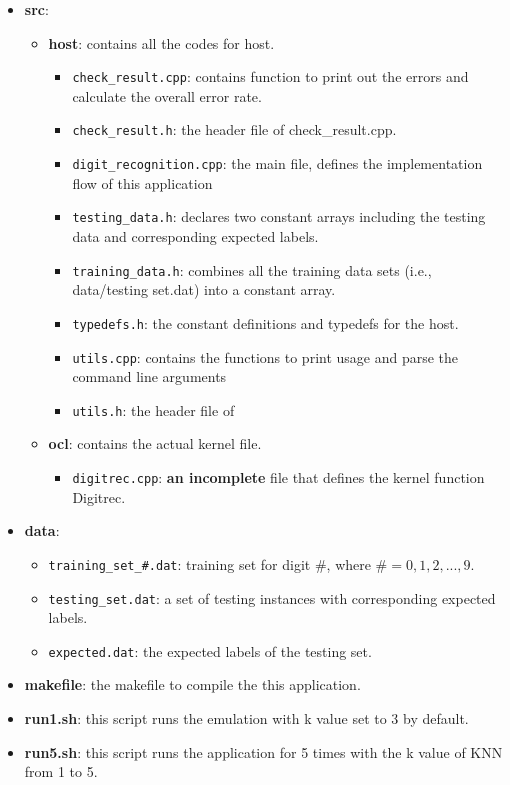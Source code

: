 \documentclass[paper=letter, fontsize=10pt]{scrartcl} %
\numberwithin{equation}{section} %
\numberwithin{figure}{section} %
\numberwithin{table}{section} %
\begin{document}
\begin{itemize}
  \item \textbf{src}: 
   	\begin{itemize}
	 	\item \textbf{host}: contains all the codes for host.
		 	\begin{itemize}
	 			\item \texttt{check\_result.cpp}: contains function to print out the errors and calculate the overall error rate.
				\item \texttt{check\_result.h}: the header file of check\_result.cpp.
	 			\item \texttt{digit\_recognition.cpp}: the main file, defines the implementation flow of this application
				\item \texttt{testing\_data.h}: declares two constant arrays including the testing data and corresponding expected labels. 
				\item \texttt{training\_data.h}: combines all the training data sets (i.e., data/testing set.dat) into a constant array. 
				\item \texttt{typedefs.h}: the constant definitions and typedefs for the host. 
				\item \texttt{utils.cpp}: contains the functions to print usage and parse the command line arguments
				\item \texttt{utils.h}: the header file of 
			\end{itemize}
		\item \textbf{ocl}: contains the actual kernel file.
		 	\begin{itemize}
	 			\item \texttt{digitrec.cpp}: \textbf{an incomplete} file that defines the kernel function Digitrec.
			\end{itemize}
	\end{itemize}
  \item \textbf{data}:
  	\begin{itemize}
	 	\item \texttt{training\_set\_\#.dat}: training set for digit $\#$, where $\#=0,1,2,...,9$.
		\item \texttt{testing\_set.dat}: a set of testing instances with corresponding expected labels.
		\item \texttt{expected.dat}: the expected labels of the testing set.
	\end{itemize}
  \item \textbf{makefile}: the makefile to compile the this application.
  \item \textbf{run1.sh}: this script runs the emulation with k value set to 3 by default.
  \item \textbf{run5.sh}: this script runs the application for 5 times with the k value of KNN from 1 to 5.
\end{itemize}
\end{document}
